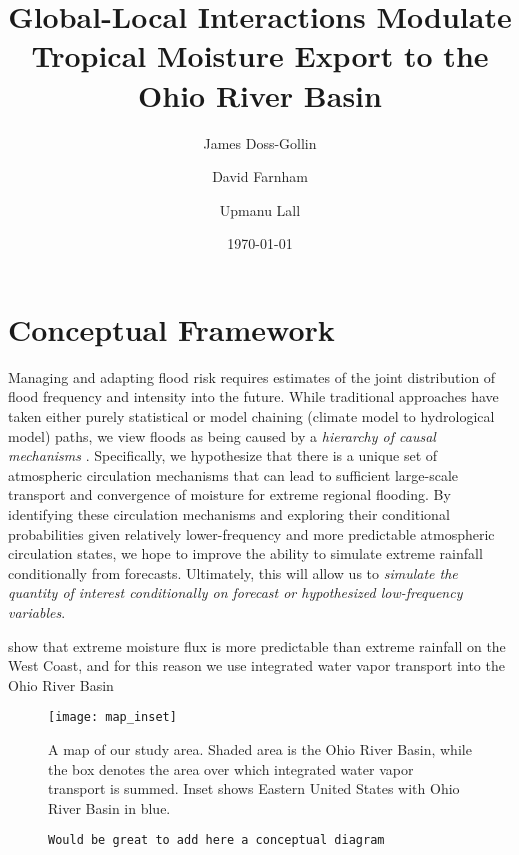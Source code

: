 \documentclass[12pt]{article}
\title{Global-Local Interactions Modulate Tropical Moisture Export to the Ohio River Basin}
\author[1,2]{James Doss-Gollin}
\author[1,2]{David Farnham}
\author[1,2]{Upmanu Lall}
\affil[1]{Columbia Water Center}
\affil[2]{Department of Earth and Environmental Engineering, Columbia University}
\date{\today}
\begin{document}
\def\ci{\perp\!\!\!\perp}
\def\ex{\mathbb{E}}
\def\prob{\mathbb{P}}
\def\ind{\mathbb{I}}
\def\grad{\triangledown}
\def\bigo{\mathcal{O}}
\def\normal{\mathcal{N}}
\def\bern{\text{Bernoulli}}
\def\logit{\text{logit}}
\def\binom{\text{Bin}}
\def\poiss{\text{Poiss}}
\def\cauchy{\text{Cauchy}}
\def\sigmoid{\vb{\sigma}}
\def\given{\big|}
\def\stan{\texttt{Stan~}}
\maketitle



\section{Conceptual Framework}

Managing and adapting flood risk requires estimates of the joint distribution of flood frequency and intensity into the future.
While traditional approaches have taken either purely statistical or model chaining (climate model to hydrological model) paths, we view floods as being caused by a \emph{hierarchy of causal mechanisms} \cite[see][]{Merz2014}.
Specifically, we hypothesize that there is a unique set of atmospheric circulation mechanisms that can lead to sufficient large-scale transport and convergence of moisture for extreme regional flooding.
By identifying these circulation mechanisms and exploring their conditional probabilities given relatively lower-frequency and more predictable atmospheric circulation states, we hope to improve the ability to simulate extreme rainfall conditionally from forecasts.
Ultimately, this will allow us to \emph{simulate the quantity of interest conditionally on forecast or hypothesized low-frequency variables}.



\citet{Lavers2016} show that extreme moisture flux is more predictable than extreme rainfall on the West Coast, and for this reason we use integrated water vapor transport into the Ohio River Basin


\begin{figure}
    \centering
    \texttt{[image: map\_inset]}
    \caption{A map of our study area. Shaded area is the Ohio River Basin, while the box denotes the area over which integrated water vapor transport is summed. Inset shows Eastern United States with Ohio River Basin in blue.}
    \label{fig:study-area}
\end{figure}
\begin{figure}
    \caption{\texttt{Would be great to add here a conceptual diagram}}
\end{figure}
\end{document}
